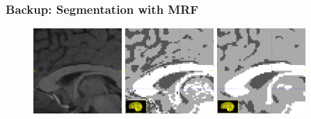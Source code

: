 \documentclass[serif]{beamer}
\begin{document}
\begin{frame}
  \frametitle{Backup: Segmentation with MRF}
  \begin{figure}
    \includegraphics[width=0.3\textwidth]{sfig/mri}
    \hspace{10pt}
    \includegraphics[width=0.3\textwidth]{sfig/seg_nosmooth}
    \hspace{10pt}
    \includegraphics[width=0.3\textwidth]{sfig/seg_smooth}
  \end{figure}
\end{frame}
\end{document}
